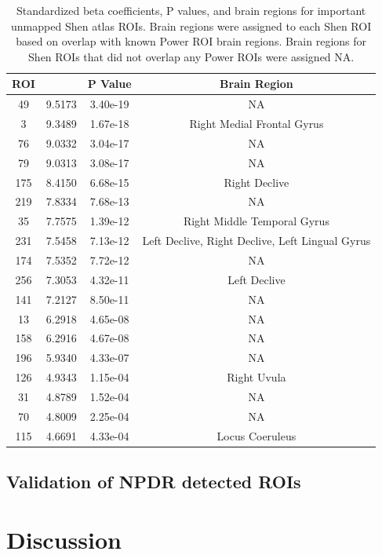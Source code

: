 \documentclass[10pt,letterpaper]{article}\usepackage[]{graphicx}\usepackage[]{color}
\begin{document}
\begin{table}[h!]
	\centering
	\caption{Standardized beta coefficients, P values, and brain regions for important unmapped Shen atlas ROIs. Brain regions were assigned to each Shen ROI based on overlap with known Power ROI brain regions. Brain regions for Shen ROIs that did not overlap any Power ROIs were assigned NA.}\label{tab:unmapped-shen-tab}
\begin{tabular}[h!]{cccc}\toprule
	\textbf{ROI} & \bm{$\beta_a$} & \textbf{P Value} & \textbf{Brain Region} \\ \midrule
	49 & 9.5173 & 3.40e-19 & NA \\
	3 & 9.3489 & 1.67e-18 & Right Medial Frontal Gyrus \\
	76 & 9.0332 & 3.04e-17 & NA \\
	79 & 9.0313 & 3.08e-17 & NA \\
	175 & 8.4150 & 6.68e-15 & Right Declive \\
	219 & 7.8334 & 7.68e-13 & NA\\
	35 & 7.7575 & 1.39e-12 & Right Middle Temporal Gyrus\\
	231 & 7.5458 & 7.13e-12 & Left Declive, Right Declive, Left Lingual Gyrus\\
	174 & 7.5352 & 7.72e-12 & NA \\
	256 & 7.3053 & 4.32e-11 & Left Declive \\
	141 & 7.2127 & 8.50e-11 & NA \\
	13 & 6.2918 & 4.65e-08 & NA \\
	158 & 6.2916 & 4.67e-08 & NA \\
	196 & 5.9340 & 4.33e-07 & NA \\
	126 & 4.9343 & 1.15e-04 & Right Uvula\\
	31 & 4.8789 & 1.52e-04 & NA \\
	70 & 4.8009 & 2.25e-04 & NA \\
	115 & 4.6691 & 4.33e-04 & Locus Coeruleus \\ \bottomrule
\end{tabular}
\end{table}

\subsection{Validation of NPDR detected ROIs}

\section{Discussion}


\end{document}

